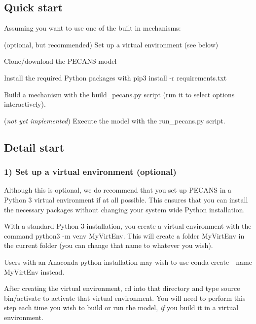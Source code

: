 \subsection*{Quick start}

Assuming you want to use one of the built in mechanisms\+:


\begin{DoxyEnumerate}
\item (optional, but recommended) Set up a virtual environment (see below)
\item Clone/download the P\+E\+C\+A\+NS model
\item Install the required Python packages with {\ttfamily pip3 install -\/r requirements.\+txt}
\item Build a mechanism with the {\ttfamily build\+\_\+pecans.\+py} script (run it to select options interactively).
\item ({\itshape not yet implemented}) Execute the model with the {\ttfamily run\+\_\+pecans.\+py} script.
\end{DoxyEnumerate}

\subsection*{Detail start}

\subsubsection*{1) Set up a virtual environment (optional)}

Although this is optional, we do recommend that you set up P\+E\+C\+A\+NS in a Python 3 virtual environment if at all possible. This ensures that you can install the necessary packages without changing your system wide Python installation.

With a standard Python 3 installation, you create a virtual environment with the command {\ttfamily python3 -\/m venv My\+Virt\+Env}. This will create a folder {\ttfamily My\+Virt\+Env} in the current folder (you can change that name to whatever you wish).

Users with an Anaconda python installation may wish to use {\ttfamily conda create -\/-\/name My\+Virt\+Env} instead.

After creating the virtual environment, {\ttfamily cd} into that directory and type {\ttfamily source bin/activate} to activate that virtual environment. You will need to perform this step each time you wish to build or run the model, {\itshape if} you build it in a virtual environment.

